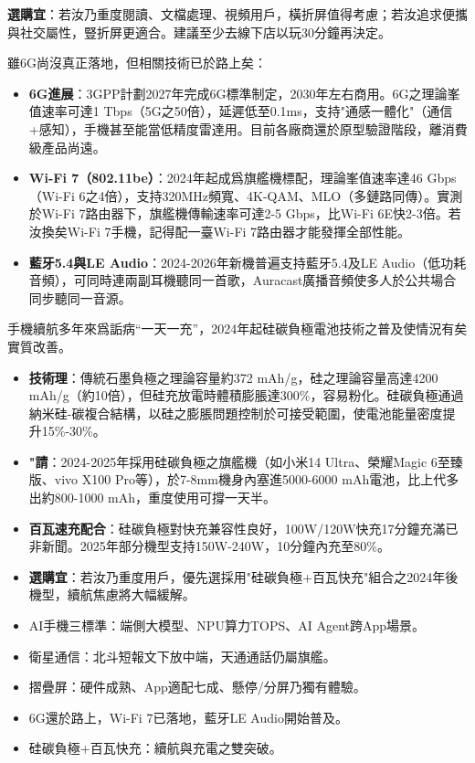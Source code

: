 \textbf{選購宜}：若汝乃重度閱讀、文檔處理、視頻用戶，橫折屏值得考慮；若汝追求便攜與社交屬性，豎折屏更適合。建議至少去線下店以玩30分鐘再決定。


雖6G尚沒真正落地，但相關技術已於路上矣：

\begin{itemize}
  \item \textbf{6G進展}：3GPP計劃2027年完成6G標準制定，2030年左右商用。6G之理論峯值速率可達1 Tbps（5G之50倍），延遲低至0.1ms，支持"通感一體化"（通信+感知），手機甚至能當低精度雷達用。目前各廠商還於原型驗證階段，離消費級產品尚遠。
  \item \textbf{Wi-Fi 7（802.11be）}：2024年起成爲旗艦機標配，理論峯值速率達46 Gbps（Wi-Fi 6之4倍），支持320MHz頻寬、4K-QAM、MLO（多鏈路同傳）。實測於Wi-Fi 7路由器下，旗艦機傳輸速率可達2-5 Gbps，比Wi-Fi 6E快2-3倍。若汝換矣Wi-Fi 7手機，記得配一臺Wi-Fi 7路由器才能發揮全部性能。
  \item \textbf{藍牙5.4與LE Audio}：2024-2026年新機普遍支持藍牙5.4及LE Audio（低功耗音頻），可同時連兩副耳機聽同一首歌，Auracast廣播音頻使多人於公共場合同步聽同一音源。
\end{itemize}


手機續航多年來爲詬病“一天一充”，2024年起硅碳負極電池技術之普及使情況有矣實質改善。

\begin{itemize}
  \item \textbf{技術理}：傳統石墨負極之理論容量約372 mAh/g，硅之理論容量高達4200 mAh/g（約10倍），但硅充放電時體積膨脹達300\%，容易粉化。硅碳負極通過納米硅-碳複合結構，以硅之膨脹問題控制於可接受範圍，使電池能量密度提升15\%-30\%。
  \item \textbf{"請}：2024-2025年採用硅碳負極之旗艦機（如小米14 Ultra、榮耀Magic 6至臻版、vivo X100 Pro等），於7-8mm機身內塞進5000-6000 mAh電池，比上代多出約800-1000 mAh，重度使用可撐一天半。
  \item \textbf{百瓦速充配合}：硅碳負極對快充兼容性良好，100W/120W快充17分鐘充滿已非新聞。2025年部分機型支持150W-240W，10分鐘內充至80\%。
  \item \textbf{選購宜}：若汝乃重度用戶，優先選採用"硅碳負極+百瓦快充"組合之2024年後機型，續航焦慮將大幅緩解。
\end{itemize}


\begin{itemize}
  \item AI手機三標準：端側大模型、NPU算力TOPS、AI Agent跨App場景。
  \item 衛星通信：北斗短報文下放中端，天通通話仍屬旗艦。
  \item 摺疊屏：硬件成熟、App適配七成、懸停/分屏乃獨有體驗。
  \item 6G還於路上，Wi-Fi 7已落地，藍牙LE Audio開始普及。
  \item 硅碳負極+百瓦快充：續航與充電之雙突破。
\end{itemize}

